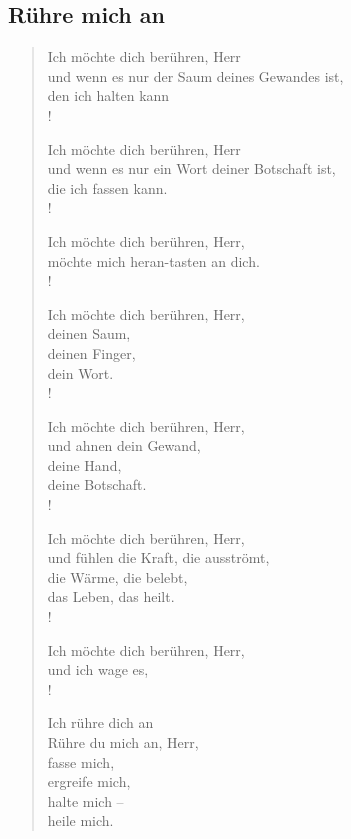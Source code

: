 \subsection{Rühre mich an}

\begin{gedicht}
\begin{verse}
Ich möchte dich berühren, Herr\\
und wenn es nur der Saum deines Gewandes ist,\\
den ich halten kann\\!

Ich möchte dich berühren, Herr\\
und wenn es nur ein Wort deiner Botschaft ist,\\
die ich fassen kann.\\!

Ich möchte dich berühren, Herr,\\
möchte mich heran-tasten an dich.\\!

Ich möchte dich berühren, Herr,\\
deinen Saum,\\
deinen Finger,\\
dein Wort.\\!

Ich möchte dich berühren, Herr,\\
und ahnen dein Gewand,\\
deine Hand,\\
deine Botschaft.\\!

Ich möchte dich berühren, Herr,\\
und fühlen die Kraft, die ausströmt,\\
die Wärme, die belebt,\\
das Leben, das heilt.\\!

Ich möchte dich berühren, Herr,\\
und ich wage es,\\!

Ich rühre dich an\\
Rühre du mich an, Herr,\\
fasse mich,\\
ergreife mich,\\
halte mich –\\
heile mich.\\

\end{verse}
\end{gedicht}
